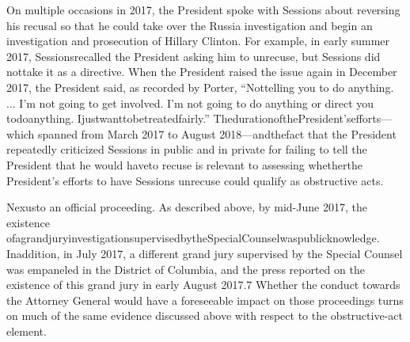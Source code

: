 On multiple occasions in 2017, the President spoke with Sessions about reversing his recusal so that he could take over the Russia investigation and begin an investigation and prosecution of Hillary Clinton. For example, in early summer 2017, Sessionsrecalled the President asking him to unrecuse, but Sessions did nottake it as a directive. When the President raised the issue again in December 2017, the President said, as recorded by Porter, “Nottelling you to do anything. ... I’m not going to get involved. I’m not going to do anything or direct you todoanything. Ijustwanttobetreatedfairly.” ThedurationofthePresident’sefforts—which spanned from March 2017 to August 2018—andthefact that the President repeatedly criticized Sessions in public and in private for failing to tell the President that he would haveto recuse is relevant to assessing whetherthe President’s efforts to have Sessions unrecuse could qualify as obstructive acts.

Nexusto an official proceeding. As described above, by mid-June 2017, the existence ofagrandjuryinvestigationsupervisedbytheSpecialCounselwaspublicknowledge. Inaddition, in July 2017, a different grand jury supervised by the Special Counsel was empaneled in the District of Columbia, and the press reported on the existence of this grand jury in early August 2017.7 Whether the conduct towards the Attorney General would have a foreseeable impact on those proceedings turns on much of the same evidence discussed above with respect to the obstructive-act element.

